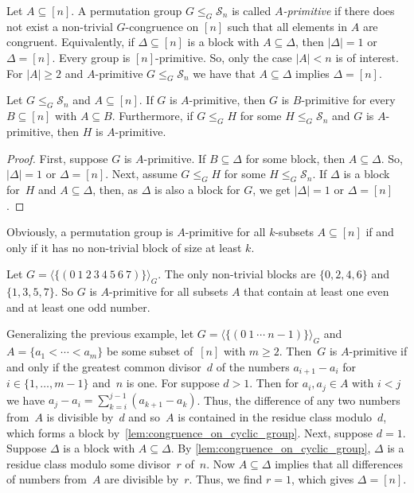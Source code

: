 
Let $A \subseteq [n]$. A permutation group $G \le_G \mathcal S_n$
is called \emph{$A$-primitive} 
if there does not exist
a non-trivial $G$-congruence on $[n]$
such that all elements in $A$ are congruent.
Equivalently, if $\Delta \subseteq [n]$ is a block with $A \subseteq \Delta$,
then $|\Delta| = 1$ or $\Delta = [n]$. 
Every group is $[n]$-primitive.
So, only the case $|A| < n$ is of interest.
For $|A| \ge 2$ and $A$-primitive $G \le_G \mathcal S_n$ we have that
$A \subseteq \Delta$ implies $\Delta = [n]$.

\begin{proposition} \label{syncmax:primitive:prop:superset}
	Let $G \le_G \mathcal S_n$ and $A \subseteq [n]$. 
	If $G$ is $A$-primitive,
	then $G$ is $B$-primitive
	for every $B \subseteq [n]$ with $A \subseteq B$.	
	Furthermore, if $G \le_G H$ for some $H \le_G \mathcal S_n$
	and $G$ is $A$-primitive, then $H$ is $A$-primitive.
\end{proposition}
\begin{proof}
	First, suppose $G$ is $A$-primitive. If $B \subseteq \Delta$ for some block,
	then $A \subseteq \Delta$.
	So, $|\Delta|=1$ or $\Delta = [n]$.	
	Next, assume $G \le_G H$ for some $H \le_G \mathcal S_n$.
	If $\Delta$ is a block for~$H$
	and $A \subseteq \Delta$,
	then, as $\Delta$ is also a block for $G$,
	we get $|\Delta| = 1$ or $\Delta = [n]$.
\end{proof}

Obviously, a permutation group is $A$-primitive for all $k$-subsets $A \subseteq [n]$
if and only if it has no non-trivial block of size at least $k$.

\begin{example}
	\label{sync_aut:permgrp:ex:Aprim}
	Let $G = \langle \{  (0 ~ 1 ~ 2 ~ 3 ~ 4 ~ 5 ~ 6 ~ 7) \} \rangle_G$.
	The only non-trivial blocks are $\{ 0, 2, 4, 6\}$
	and $\{ 1, 3, 5, 7 \}$.
	So $G$ is $A$-primitive
	for all subsets $A$ that contain 
	at least one even and at least one odd number. 
\end{example}

\begin{example} \label{sync_aut:permgrp:ex:cyclicAprim}
	Generalizing the previous example, let $G = \langle \{  (0 ~ 1 ~ \cdots ~ n - 1) \} \rangle_G$ and
	$A = \{ a_1 < \cdots < a_m \}$ be some subset of~$[n]$
	with $m \ge 2$.
	Then~$G$ is $A$-primitive if and only if the greatest common divisor~$d$
	of the numbers $a_{i+1} - a_{i}$ for $i \in \{1,\ldots,m-1\}$
	and~$n$ is one.	
	For suppose $d > 1$. Then for $a_i, a_j \in A$
	with $i < j$ we have $a_j - a_i = \sum_{k=i}^{j-1} (a_{k+1} - a_k)$.
	Thus, the difference of any two numbers from~$A$
	is divisible by~$d$ and so~$A$ is contained in the residue class modulo~$d$,
	which forms a block by~\cref{lem:congruence_on_cyclic_group}.
	Next, suppose $d = 1$.
	Suppose $\Delta$ is a block with $A \subseteq \Delta$.
	By \cref{lem:congruence_on_cyclic_group}, $\Delta$
	is a residue class modulo some divisor~$r$ of~$n$.
	Now $A \subseteq \Delta$
	implies that all differences of numbers from~$A$
	are divisible by~$r$. Thus, we find $r = 1$, which gives $\Delta = [n]$.	
\end{example}

